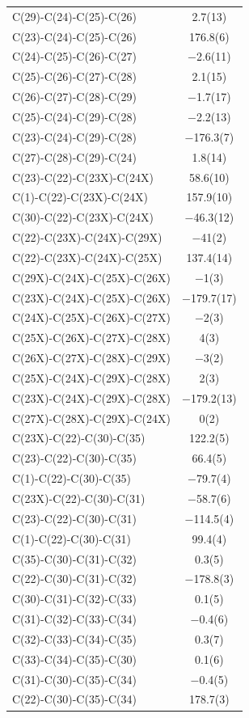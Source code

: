 \begin{center}
{\begin{supertabular}{p{1.8in}c}
C(29)-C(24)-C(25)-C(26)&2.7(13)\\
C(23)-C(24)-C(25)-C(26)&176.8(6)\\
C(24)-C(25)-C(26)-C(27)&$-$2.6(11)\\
C(25)-C(26)-C(27)-C(28)&2.1(15)\\
C(26)-C(27)-C(28)-C(29)&$-$1.7(17)\\
C(25)-C(24)-C(29)-C(28)&$-$2.2(13)\\
C(23)-C(24)-C(29)-C(28)&$-$176.3(7)\\
C(27)-C(28)-C(29)-C(24)&1.8(14)\\
C(23)-C(22)-C(23X)-C(24X)&58.6(10)\\
C(1)-C(22)-C(23X)-C(24X)&157.9(10)\\
C(30)-C(22)-C(23X)-C(24X)&$-$46.3(12)\\
C(22)-C(23X)-C(24X)-C(29X)&$-$41(2)\\
C(22)-C(23X)-C(24X)-C(25X)&137.4(14)\\
C(29X)-C(24X)-C(25X)-C(26X)&$-$1(3)\\
C(23X)-C(24X)-C(25X)-C(26X)&$-$179.7(17)\\
C(24X)-C(25X)-C(26X)-C(27X)&$-$2(3)\\
C(25X)-C(26X)-C(27X)-C(28X)&4(3)\\
C(26X)-C(27X)-C(28X)-C(29X)&$-$3(2)\\
C(25X)-C(24X)-C(29X)-C(28X)&2(3)\\
C(23X)-C(24X)-C(29X)-C(28X)&$-$179.2(13)\\
C(27X)-C(28X)-C(29X)-C(24X)&0(2)\\
C(23X)-C(22)-C(30)-C(35)&122.2(5)\\
C(23)-C(22)-C(30)-C(35)&66.4(5)\\
C(1)-C(22)-C(30)-C(35)&$-$79.7(4)\\
C(23X)-C(22)-C(30)-C(31)&$-$58.7(6)\\
C(23)-C(22)-C(30)-C(31)&$-$114.5(4)\\
C(1)-C(22)-C(30)-C(31)&99.4(4)\\
C(35)-C(30)-C(31)-C(32)&0.3(5)\\
C(22)-C(30)-C(31)-C(32)&$-$178.8(3)\\
C(30)-C(31)-C(32)-C(33)&0.1(5)\\
C(31)-C(32)-C(33)-C(34)&$-$0.4(6)\\
C(32)-C(33)-C(34)-C(35)&0.3(7)\\
C(33)-C(34)-C(35)-C(30)&0.1(6)\\
C(31)-C(30)-C(35)-C(34)&$-$0.4(5)\\
C(22)-C(30)-C(35)-C(34)&178.7(3)\\
\end{supertabular}
}
\end{center}


